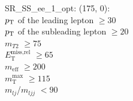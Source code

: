 SR\_SS\_ee\_1\_opt: (175, 0): \\
$p_{\text{T}}$ of the leading lepton $\geq 30$ \\
$p_{\text{T}}$ of the subleading lepton $\geq 20$ \\
$m_{T2}$ $\geq 75$ \\
$E_{\text{T}}^{\text{miss,rel}}$ $\geq 65$ \\
$m_{\text{eff}}$ $\geq 200$ \\
$m_{\text{T}}^{\text{max}}$ $\geq 115$ \\
$m_{lj}$/$m_{ljj}$ $<90$ \\
